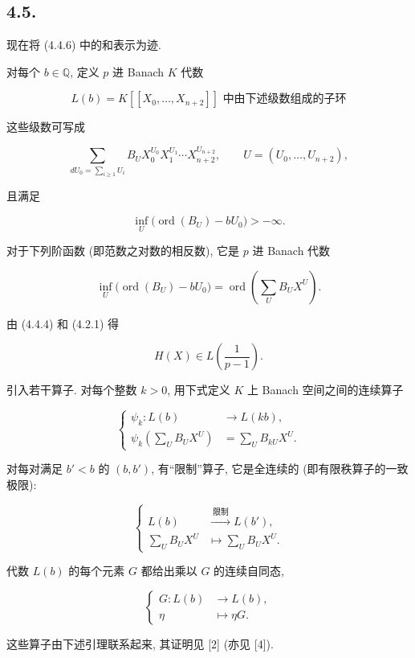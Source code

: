 \subsection*{4.5.}
现在将 (4.4.6) 中的和表示为迹.

对每个 $b\in\mathbb Q$, 定义 $p$ 进 Banach $K$ 代数

\begin{equation}\tag{4.5.1}
L(b)=\text{$K[[X_0,\ldots,X_{n+2}]]$ 中由下述级数组成的子环}
\end{equation}

这些级数可写成

\begin{equation}\tag{4.5.2}
\sum_{dU_0=\sum_{i\geq1}U_i}
B_UX_0^{U_0}X_1^{U_1}\cdots X_{n+2}^{U_{n+2}},
\qquad U=(U_0,\ldots,U_{n+2}),
\end{equation}

且满足

\begin{equation}\tag{4.5.3}
\inf_U\bigl(\operatorname{ord}(B_U)-bU_0\bigr)>-\infty.
\end{equation}

对于下列阶函数 (即范数之对数的相反数), 它是 $p$ 进 Banach 代数

\begin{equation}\tag{4.5.4}
\inf_U\bigl(\operatorname{ord}(B_U)-bU_0\bigr)
=\operatorname{ord}\!\left(\sum_U B_UX^U\right).
\end{equation}

由 (4.4.4) 和 (4.2.1) 得

\[
H(X)\in L\!\left(\frac1{p-1}\right).
\]

引入若干算子. 对每个整数 $k>0$, 用下式定义 $K$ 上 Banach 空间之间的连续算子

\begin{equation}\tag{4.5.5}
\left\{
\begin{aligned}
\psi_k:L(b)&\longrightarrow L(kb),\\
\psi_k\!\left(\sum_U B_UX^U\right)&=\sum_U B_{kU}X^U.
\end{aligned}
\right.
\end{equation}

对每对满足 $b'<b$ 的 $(b,b')$, 有“限制”算子,
它是全连续的 (即有限秩算子的一致极限):

\begin{equation}\tag{4.5.6}
\left\{
\begin{aligned}
L(b)&\xrightarrow{\ \text{限制}\ }L(b'),\\
\sum_U B_UX^U&\longmapsto\sum_U B_UX^U.
\end{aligned}
\right.
\end{equation}

代数 $L(b)$ 的每个元素 $G$ 都给出乘以 $G$ 的连续自同态,

\begin{equation}\tag{4.5.7}
\left\{
\begin{aligned}
G:L(b)&\longrightarrow L(b),\\
\eta&\longmapsto\eta G.
\end{aligned}
\right.
\end{equation}

这些算子由下述引理联系起来, 其证明见 [2] (亦见 [4]).
